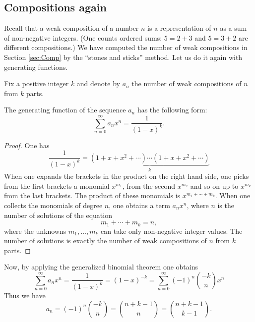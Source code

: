 \begin{page}
\setcounter{section}{3}
\setcounter{subsection}{2}
\setcounter{dfn}{1}
\label{portion:884}

\subsection{Compositions again}
Recall that a weak composition of a number $n$ is a representation of $n$ as a sum of non-negative integers.
(One counts ordered sums: $5 = 2 + 3$ and $5 = 3 + 2$ are different compositions.)
We have computed the number of weak compositions in Section \ref{sec:Comp} by the ``stones and sticks'' method.
Let us do it again with generating functions.

Fix a positive integer $k$ and denote by $a_n$ the number of weak compositions of $n$ from $k$ parts.

\end{page}

\begin{page}
\setcounter{section}{3}
\setcounter{subsection}{2}
\setcounter{dfn}{2}
\label{portion:886}

\begin{thm}
The generating function of the sequence $a_n$ has the following form:
\[
\sum_{n=0}^\infty a_n x^n = \frac{1}{(1-x)^k}.
\]
\end{thm}

\end{page}

\begin{page}
\setcounter{section}{3}
\setcounter{subsection}{3}
\setcounter{dfn}{2}
\label{portion:887}

\begin{proof}
One has
\[
\frac{1}{(1-x)^k} = \underbrace{(1+x+x^2+\cdots)\cdots(1+x+x^2+\cdots)}_{k}
\]
When one expands the brackets in the product on the right hand side,
one picks from the first brackets a monomial $x^{m_1}$, from the second $x^{m_2}$ and so on up to $x^{m_k}$ from the last brackets.
The product of these monomials is $x^{m_1+\cdots+m_k}$.
When one collects the monomials of degree $n$, one obtains a term $a_n x^n$,
where $n$ is the number of solutions of the equation
\[
m_1 + \cdots + m_k = n,
\]
where the unknowns $m_1, \ldots, m_k$ can take only non-negative integer values.
The number of solutions is exactly the number of weak compositions of $n$ from $k$ parts.
\end{proof}

Now, by applying the generalized binomial theorem one obtains
\[
\sum_{n=0}^\infty a_n x^n = \frac{1}{(1-x)^k} = (1-x)^{-k} = \sum_{n=0}^\infty (-1)^n \binom{-k}{n} x^n
\]
Thus we have
\[
a_n = (-1)^n \binom{-k}{n} = \binom{n+k-1}{n} = \binom{n+k-1}{k-1}.
\]




\end{page}

